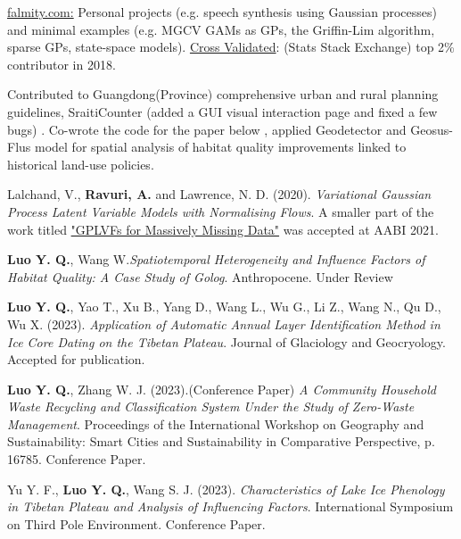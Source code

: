 

\begin{cvskills}

  {\href{https://www.falmity.com}{falmity.com:} Personal projects (e.g. speech synthesis using Gaussian processes) and minimal examples (e.g. MGCV GAMs as GPs, the Griffin-Lim algorithm, sparse GPs, state-space models). \href{https://stats.stackexchange.com/users/211930/infprobscix}{Cross Validated}: (Stats Stack Exchange) top 2\% contributor in 2018.}

  {Contributed to Guangdong(Province) comprehensive urban and rural planning guidelines, SraitiCounter (added a GUI visual interaction page and fixed a few bugs) . Co-wrote the code for the paper below , applied Geodetector and Geosus-Flus model for spatial analysis of habitat quality improvements linked to historical land-use policies.}

  {\item Lalchand, V., \textbf{Ravuri, A.} and Lawrence, N. D. (2020). \textit{Variational Gaussian Process Latent Variable Models with Normalising Flows}. A smaller part of the work titled \href{https://openreview.net/pdf?id=zaMwvOjsyym}{"GPLVFs for Massively Missing Data"} was accepted at AABI 2021.}
  

{
  \item \textbf{Luo Y. Q.}, Wang W.\textit{Spatiotemporal Heterogeneity and Influence Factors of Habitat Quality: A Case Study of Golog}. Anthropocene. Under Review
  \item \textbf{Luo Y. Q.}, Yao T., Xu B., Yang D., Wang L., Wu G., Li Z., Wang N., Qu D., Wu X. (2023). \textit{Application of Automatic Annual Layer Identification Method in Ice Core Dating on the Tibetan Plateau}. Journal of Glaciology and Geocryology. Accepted for publication.
  \item \textbf{Luo Y. Q.}, Zhang W. J. (2023).(Conference Paper) \textit{A Community Household Waste Recycling and Classification System Under the Study of Zero-Waste Management}. Proceedings of the International Workshop on Geography and Sustainability: Smart Cities and Sustainability in Comparative Perspective, p. 16785. Conference Paper.
  \item Yu Y. F., \textbf{Luo Y. Q.}, Wang S. J. (2023). \textit{Characteristics of Lake Ice Phenology in Tibetan Plateau and Analysis of Influencing Factors}. International Symposium on Third Pole Environment. Conference Paper.
   }



\end{cvskills}




